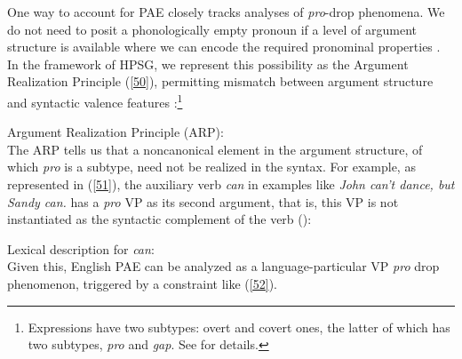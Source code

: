 {One way to account for PAE closely tracks analyses of {\it pro}-drop phenomena. We do not need to posit a phonologically empty pronoun if a level of argument structure is
available where we can encode the required pronominal properties \citep[see][]{Bresnan1982a,GSag2000a-u,Kim2006, Ginzburg2018}. In the framework of HPSG, we represent this possibility as the Argument Realization Principle (\ref{50}), permitting mismatch between argument structure and syntactic valence features \citep{GSag2000a-u}:\footnote{Expressions have two subtypes: overt and covert ones, the latter of which has two subtypes, \textit{pro} and \textit{gap}. See \citet{Sag2012a} for details.}

\ea
\label{50}
Argument Realization Principle (ARP):\\
 \impl
{}
\z
The ARP tells us that a noncanonical  element
in the argument structure, of which \textit{pro} is a subtype, need not be realized in the syntax.
 For
example, as represented in (\ref{51}), the auxiliary
verb \textit{can} in examples like \textit{John can't dance, but Sandy can.} has a \textit{pro} VP as its second argument, that is, this VP is not instantiated as the syntactic
complement of the verb (\citealt{Kim2006}):

\ea
\label{51}
Lexical description for \textit{can}:\\
\z
%
%
Given this, English PAE can be analyzed as a language-particular VP \textit{pro} drop phenomenon, triggered
by a constraint like (\ref{52}). 

}

